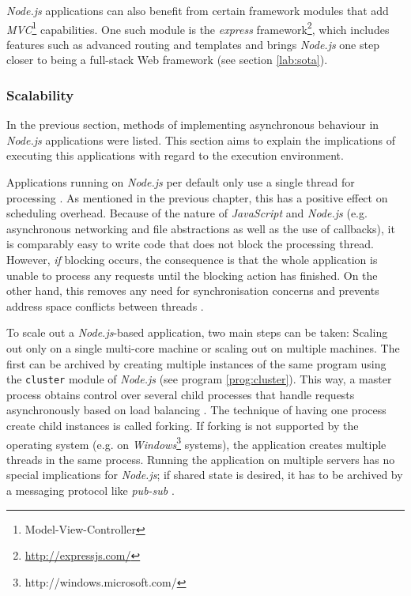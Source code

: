 \textit{Node.js} applications can also benefit from certain framework modules that add \textit{MVC}\footnote{Model-View-Controller} capabilities. One such module is the \textit{express} framework\footnote{\url{http://expressjs.com/}}, which includes features such as advanced routing and templates and brings \textit{Node.js} one step closer to being a full-stack Web framework (see section \ref{lab:sota}).

\subsubsection*{Scalability}
In the previous section, methods of implementing asynchronous behaviour in \textit{Node.js} applications were listed. This section aims to explain the implications of executing this applications with regard to the execution environment.

Applications running on \textit{Node.js} per default only use a single thread for processing \cite{node-loop}. As mentioned in the previous chapter, this has a positive effect on scheduling overhead. Because of the nature of \textit{JavaScript} and \textit{Node.js} (e.g. asynchronous networking and file abstractions as well as the use of callbacks), it is comparably easy to write code that does not block the processing thread. However, \textit{if} blocking occurs, the consequence is that the whole application is unable to process any requests until the blocking action has finished. On the other hand, this removes any need for synchronisation concerns and prevents address space conflicts between threads \cite[p. 105]{Erb2012}.

To scale out a \textit{Node.js}-based application, two main steps can be taken: Scaling out only on a single multi-core machine or scaling out on multiple machines. The first can be archived by creating multiple instances of the same program using the \texttt{cluster} module of \textit{Node.js} (see program \ref{prog:cluster}). This way, a master process obtains control over several child processes that handle requests asynchronously based on load balancing \cite[p. 64]{Hughes-Croucher2012}. The technique of having one process create child instances is called forking. If forking is not supported by the operating system (e.g. on \textit{Windows}\footnote{http://windows.microsoft.com/} systems), the application creates multiple threads in the same process. Running the application on multiple servers has no special implications for \textit{Node.js}; if shared state is desired, it has to be archived by a messaging protocol like \textit{pub-sub} \cite[p. 137]{Hughes-Croucher2012}.

